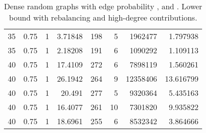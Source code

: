 \documentclass[a4paper,11pt]{article}
\begin{document}
\begin{table}
\begin{center}
\begin{tabular}{|rrr|r|r|rr|r|}
35 & 0.75 & 1 & 3.71848 & 198 & 5 & 1962477 & 1.797938 \\
35 & 0.75 & 1 & 2.18208 & 191 & 6 & 1090292 & 1.109113 \\
40 & 0.75 & 1 & 17.4109 & 272 & 6 & 7898119 & 1.560261 \\
40 & 0.75 & 1 & 26.1942 & 264 & 9 & 12358406 & 13.616799 \\
40 & 0.75 & 1 & 20.491 & 277 & 5 & 9320364 & 5.435163 \\
40 & 0.75 & 1 & 16.4077 & 261 & 10 & 7301820 & 9.935822 \\
40 & 0.75 & 1 & 18.6961 & 255 & 6 & 8532342 & 3.864666 \\
\hline
\end{tabular}
\end{center}
\caption{Dense random graphs with edge probability ,
   and . Lower bound with rebalancing and
  high-degree contributions.}
\label{tab:dense-highdegree}
\end{table}
\end{document}
